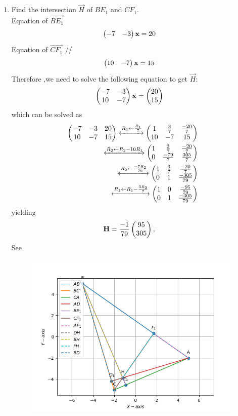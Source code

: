 \documentclass[11pt]{book}
\begin{document}
\begin{enumerate}[label=\thesection.\arabic*.,ref=\thesection.\theenumi]
\item Find the intersection $\vec{H}$ of $BE_1$ and $CF_1$.
 \\  \solution Equation of $\vec{BE_1}$ \\
\begin{align}
    \begin{pmatrix}-7 & -3\end{pmatrix}\mathbf{x}&= 20
\end{align}
Equation of $\vec{CF_1}$ //
\begin{align}
    \begin{pmatrix}10 & -7\end{pmatrix}\mathbf{x}&=15
\end{align}
Therefore ,we need to solve the following equation to get $\vec{H}:$ \\
\begin{align}
        \begin{pmatrix}-7&-3\\10&-7\end{pmatrix} \mathbf{x} &= \begin{pmatrix}20\\15\end{pmatrix}
\end{align}
%
which can be solved as 
%
\begin{align}
        \begin{pmatrix}-7&-3&20\\10&-7&15\end{pmatrix}
	 \xleftrightarrow[]{R_1 \leftarrow \frac{R_1}{7}}
        \begin{pmatrix}1& \frac{3}{7}& \frac{-20}{7}\\10&-7&15\end{pmatrix}\\
	 \xleftrightarrow[]{R_2 \leftarrow R_2-10R_1}
        \begin{pmatrix}1& \frac{3}{7}&\frac{-20}{7}\\0&\frac{-79}{7}&\frac{305}{7}\end{pmatrix} \\
	 \xleftrightarrow[]{R_2 \leftarrow \frac{-7R_2}{79}}
        \begin{pmatrix}1&\frac{3}{7}&\frac{-20}{7}\\0&1&\frac{-305}{79}\end{pmatrix} \\
         \xleftrightarrow[]{R_1 \leftarrow R_1-\frac{3R_2}{7}}
        \begin{pmatrix}1&0&\frac{-95}{79}\\0&1&\frac{-305}{79}\end{pmatrix}
\end{align}
%
yielding
%
\begin{align}
        \vec{H}&=\frac{-1}{79}\myvec{{95}\\{305}}
		\label{eq:geo-alt-H},
\end{align}
%
See 
\begin{figure}[H]
\centering
\includegraphics[width=\columnwidth]{figs/H_intersection.png}

\end{figure}
\end{enumerate}
\end{document}
